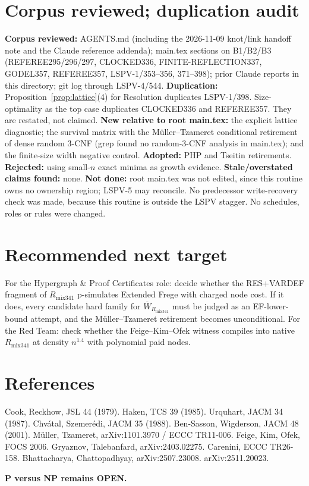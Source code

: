 \documentclass[11pt]{article}
\begin{document}
\section{Corpus reviewed; duplication audit}
\textbf{Corpus reviewed:} AGENTS.md (including the 2026-11-09 knot/link handoff note and the Claude reference addenda); main.tex sections on B1/B2/B3 (REFEREE295/296/297, CLOCKED336, FINITE-REFLECTION337, GODEL357, REFEREE357, LSPV-1/353--356, 371--398); prior Claude reports in this directory; git log through LSPV-4/544.
\textbf{Duplication:} Proposition~\ref{prop:lattice}(4) for Resolution duplicates LSPV-1/398. Size-optimality as the top case duplicates CLOCKED336 and REFEREE357. They are restated, not claimed.
\textbf{New relative to root main.tex:} the explicit lattice diagnostic; the survival matrix with the Müller--Tzameret conditional retirement of dense random 3-CNF (grep found no random-3-CNF analysis in main.tex); and the finite-size width negative control.
\textbf{Adopted:} PHP and Tseitin retirements. \textbf{Rejected:} using small-$n$ exact minima as growth evidence. \textbf{Stale/overstated claims found:} none.
\textbf{Not done:} root main.tex was not edited, since this routine owns no ownership region; LSPV-5 may reconcile. No predecessor write-recovery check was made, because this routine is outside the LSPV stagger. No schedules, roles or rules were changed.

\section{Recommended next target}
For the Hypergraph \& Proof Certificates role: decide whether the RES+VARDEF fragment of $R_{\mathrm{mix341}}$ p-simulates Extended Frege with charged node cost. If it does, every candidate hard family for $\overline W_{R_{\mathrm{mix341}}}$ must be judged as an EF-lower-bound attempt, and the Müller--Tzameret retirement becomes unconditional. For the Red Team: check whether the Feige--Kim--Ofek witness compiles into native $R_{\mathrm{mix341}}$ at density $n^{1.4}$ with polynomial paid nodes.

\section*{References}
Cook, Reckhow, JSL 44 (1979). Haken, TCS 39 (1985). Urquhart, JACM 34 (1987). Chv\'atal, Szemer\'edi, JACM 35 (1988). Ben-Sasson, Wigderson, JACM 48 (2001). M\"uller, Tzameret, arXiv:1101.3970 / ECCC TR11-006. Feige, Kim, Ofek, FOCS 2006. Gryaznov, Talebanfard, arXiv:2403.02275. Carenini, ECCC TR26-158. Bhattacharya, Chattopadhyay, arXiv:2507.23008. arXiv:2511.20023.

\medskip\noindent\textbf{P versus NP remains OPEN.}
\end{document}
